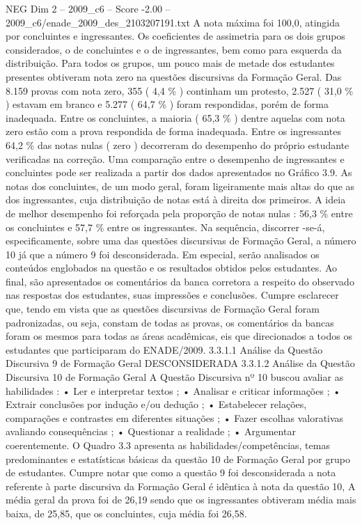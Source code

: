 \begin{textsample}{NEG Dim 2 – 2009\_c6 – Score -2.00 – 2009\_c6/enade\_2009\_des\_2103207191.txt}
A nota máxima foi 100,0, atingida por concluintes e ingressantes.
Os coeficientes de assimetria para os dois grupos considerados, o de concluintes e o de ingressantes, bem como para esquerda da distribuição.
Para todos os grupos, um pouco mais de metade dos estudantes presentes obtiveram nota zero na questões discursivas da Formação Geral.
Das 8.159 provas com nota zero, 355 ( 4,4 \% ) continham um protesto, 2.527 ( 31,0 \% ) estavam em branco e 5.277 ( 64,7 \% ) foram respondidas, porém de forma inadequada.
Entre os concluintes, a maioria ( 65,3 \% ) dentre aquelas com nota zero estão com a prova respondida de forma inadequada.
Entre os ingressantes 64,2 \% das notas nulas ( zero ) decorreram do desempenho do próprio estudante verificadas na correção.
Uma comparação entre o desempenho de ingressantes e concluintes pode ser realizada a partir dos dados apresentados no Gráfico 3.9.
As notas dos concluintes, de um modo geral, foram ligeiramente mais altas do que as dos ingressantes, cuja distribuição de notas está à direita dos primeiros.
A ideia de melhor desempenho foi reforçada pela proporção de notas nulas : 56,3 \% entre os concluintes e 57,7 \% entre os ingressantes.
Na sequência, discorrer -se-á, especificamente, sobre uma das questões discursivas de Formação Geral, a número 10 já que a número 9 foi desconsiderada.
Em especial, serão analisados os conteúdos englobados na questão e os resultados obtidos pelos estudantes.
Ao final, são apresentados os comentários da banca corretora a respeito do observado nas respostas dos estudantes, suas impressões e conclusões.
Cumpre esclarecer que, tendo em vista que as questões discursivas de Formação Geral foram padronizadas, ou seja, constam de todas as provas, os comentários da bancas foram os mesmos para todas as áreas acadêmicas, eis que direcionados a todos os estudantes que participaram do ENADE/2009. 3.3.1.1 Análise da Questão Discursiva 9 de Formação Geral DESCONSIDERADA 3.3.1.2 Análise da Questão Discursiva 10 de Formação Geral A Questão Discursiva nº 10 buscou avaliar as habilidades : • Ler e interpretar textos ; • Analisar e criticar informações ; • Extrair conclusões por indução e/ou dedução ; • Estabelecer relações, comparações e contrastes em diferentes situações ; • Fazer escolhas valorativas avaliando consequências ; • Questionar a realidade ; • Argumentar coerentemente.
O Quadro 3.3 apresenta as habilidades/competências, temas predominantes e estatísticas básicas da questão 10 de Formação Geral por grupo de estudantes.
Cumpre notar que como a questão 9 foi desconsiderada a nota referente à parte discursiva da Formação Geral é idêntica à nota da questão 10, A média geral da prova foi de 26,19 sendo que os ingressantes obtiveram média mais baixa, de 25,85, que os concluintes, cuja média foi 26,58.

\end{textsample}
